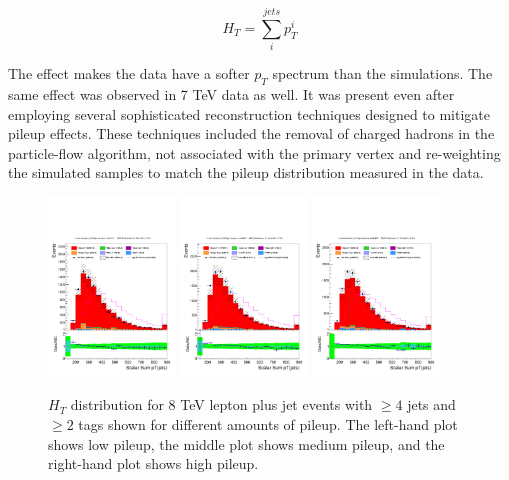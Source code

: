 \begin{equation}
H_{T} = \sum_{i}^{jets} p_{T}^{i}
\end{equation}

\noindent The effect makes the data have a softer $p_{T}$ spectrum
than the simulations.  The same effect was observed in 7 TeV data
as well.  It was present even after employing several sophisticated
reconstruction techniques designed to mitigate pileup effects.  These
techniques included the removal of charged hadrons in the
particle-flow algorithm, not associated with the primary vertex and
re-weighting the simulated samples to match the pileup distribution
measured in the data.  

\begin{figure}[hbtp]
 \begin{center}
   \includegraphics[width=0.30\textwidth]{Figures/Analysis_1_Diagrams/d2MCPlots_Ht_cut10_4J_2T_lowNPV_Combined.pdf}
   \includegraphics[width=0.30\textwidth]{Figures/Analysis_1_Diagrams/d2MCPlots_Ht_cut11_4J_2T_midNPV_Combined.pdf}
   \includegraphics[width=0.30\textwidth]{Figures/Analysis_1_Diagrams/d2MCPlots_Ht_cut12_4J_2T_highNPV_Combined.pdf}
   \caption{$H_{T}$ distribution for 8 TeV lepton plus jet events with $\geq 4$ jets and $\geq 2$ tags shown
   for different amounts of pileup. The left-hand plot shows low pileup, the middle plot shows
   medium pileup, and the right-hand plot shows high pileup.}
   \label{fig:HTreweight}
 \end{center}
\end{figure}



